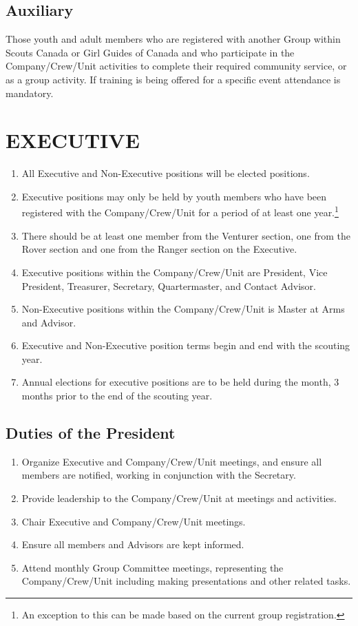 \documentclass{Service_Corps_Document}
\begin{document}
\subsection{Auxiliary}
Those youth and adult members who are registered with another Group within Scouts Canada or Girl Guides of Canada and who participate in the Company/Crew/Unit activities to complete their required community service, or as a group activity. If training is being offered for a specific event attendance is mandatory. 
\section{EXECUTIVE}
\begin{enumerate}
	\item All Executive and Non-Executive positions will be elected positions.
	\item Executive positions may only be held by youth members who have been registered with the Company/Crew/Unit for a period of at least one year.\footnote{An exception to this can be made based on the current group registration.}
	\item There should be at least one member from the Venturer section, one from the Rover section and one from the Ranger section on the Executive.\footnotemark[\value{footnote}]
	\item Executive positions within the Company/Crew/Unit are President, Vice President, Treasurer, Secretary, Quartermaster, and Contact Advisor.
	\item Non-Executive positions within the Company/Crew/Unit is Master at Arms and Advisor.
	\item Executive and Non-Executive position terms begin and end with the scouting year.
	\item Annual elections for executive positions are to be held during the month, 3 months prior to the end of the scouting year.
\end{enumerate}
\subsection{Duties of the President}
\begin{enumerate}
	\item Organize Executive and Company/Crew/Unit meetings, and ensure all members are notified, working in conjunction with the Secretary.
	\item Provide leadership to the Company/Crew/Unit at meetings and activities. 
	\item Chair Executive and Company/Crew/Unit meetings.
	\item Ensure all members and Advisors are kept informed.
	\item Attend monthly Group Committee meetings, representing the Company/Crew/Unit including making presentations and other related tasks.
\end{enumerate}
\end{document}
